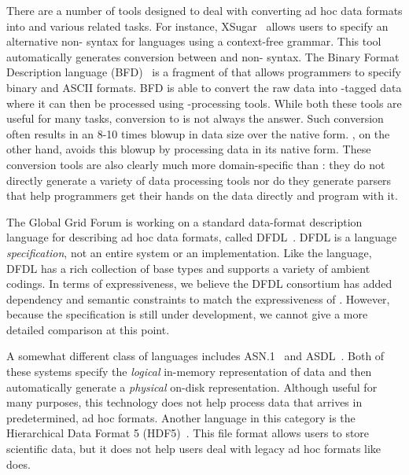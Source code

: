 There are a number of tools designed to deal with converting ad hoc
data formats into \xml{} and various related tasks.  For instance,
XSugar~\cite{brabrand+:xsugar2005} allows users to specify an
alternative non-\xml{} syntax for \xml{} languages using a context-free
grammar.  This tool automatically generates conversion between \xml{} and
non-\xml{} syntax.  The Binary Format Description language 
(BFD)~\cite{bfd} is a fragment of
\xml{} that allows programmers to specify binary and ASCII formats.  BFD
is able to convert the raw data into \xml{}-tagged data where it can then be
processed using \xml{}-processing tools.    While both these tools are 
useful for many
tasks, conversion to \xml{} is not always the answer.  Such conversion
often results in an 8-10 times blowup in data size over the native form.
\padsml{}, on the other hand, avoids this blowup by processing data in its 
native form.  These conversion tools are also clearly much more 
domain-specific than \padsml{}:  they do not directly generate a variety of 
data processing tools nor do they generate parsers that help programmers
get their hands on the data directly and program with it.

The Global Grid Forum is working on a standard data-format description
language for describing ad hoc data formats, called
DFDL~\cite{dfdl-proposal,dfdl-primer}. DFDL is a language
\textit{specification}, not an entire system or an implementation.
Like the \padsml{} language, DFDL{} has a rich collection of base
types and supports a variety of ambient codings.  In terms of
expressiveness, we believe the DFDL consortium has added dependency
and semantic constraints to match the expressiveness of \padsc{}.
However, because the specification is still under development, we
cannot give a more detailed comparison at this point.


A somewhat different class of languages includes
\textsc{ASN.1}~\cite{asn} and \textsc{ASDL}~\cite{asdl}.  Both of
these systems specify the {\em logical\/} in-memory representation of
data and then automatically generate a {\em physical\/} on-disk
representation.  Although useful for many purposes, this technology
does not help process data that arrives in predetermined, ad hoc
formats.  Another language in this category is the Hierarchical Data
Format 5 (HDF5)~\cite{hdf5}.  This file format allows users to store
scientific data, but it does not help users deal with legacy ad hoc
formats like \padsml{} does.

